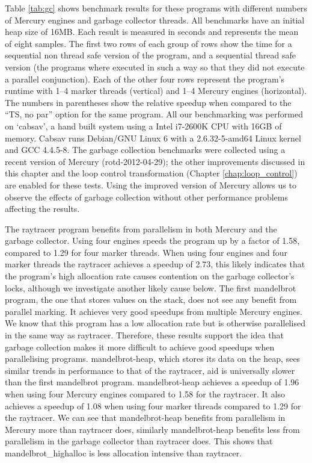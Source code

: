 Table \ref{tab:gc} shows benchmark results for these programs
with different numbers of Mercury engines and garbage collector threads.
All benchmarks have an initial heap size of 16MB.
Each result is measured in seconds and represents the mean of eight samples.
The first two rows of each group of rows show the time for a sequential
non thread safe version of the program,
and a sequential thread safe version
(the programs where executed in such a way so that they did not execute a
parallel conjunction).
Each of the other four rows represent the program's runtime with
1--4 marker threads (vertical) and
1--4 Mercury engines (horizontal).
The numbers in parentheses show the relative speedup when compared to the
``TS, no par'' option for the same program.
\label{cabsav}
All our benchmarking was performed on `cabsav',
a hand built system using a Intel i7-2600K CPU 
with 16GB of memory.
Cabsav runs Debian/GNU Linux 6
with a 2.6.32-5-amd64 Linux kernel and GCC 4.4.5-8.
The garbage collection benchmarks were collected using a recent version of
Mercury (rotd-2012-04-29);
the other improvements discussed in this chapter and the loop control
transformation (Chapter \ref{chap:loop_control})
are enabled for these tests.
Using the improved version of Mercury allows us to observe the effects of
garbage collection without other performance problems affecting the results.

The raytracer program benefits from parallelism in both Mercury and the
garbage collector.
Using four engines speeds the program up by a factor of 1.58,
compared to 1.29 for four marker threads.
When using four engines and four marker threads the raytracer
achieves a speedup of 2.73,
this likely indicates that the program's high allocation rate causes
contention on the garbage collector's locks,
although we investigate another likely cause below.
The first mandelbrot program, the one that stores values on the stack,
does not see any benefit from parallel marking.
It achieves very good speedups from multiple Mercury engines.
We know that this program has a low allocation rate
but is otherwise parallelised in the same way as raytracer.
Therefore,
these results support the idea that garbage collection makes it more
difficult to achieve good speedups when parallelising programs.
mandelbrot-heap, which stores its data on the heap,
sees similar trends in performance to that of the raytracer,
aid is universally slower than the first mandelbrot program.
mandelbrot-heap achieves a speedup of 1.96 when using four Mercury engines
compared to 1.58 for the raytracer.
It also achieves a speedup of 1.08 when using four marker threads compared
to 1.29 for the raytracer.
We can see that mandelbrot-heap benefits from parallelism in Mercury
more than raytracer does,
similarly mandelbrot-heap benefits less from parallelism in the garbage
collector than raytracer does.
This shows that mandelbrot\_highalloc is less allocation intensive
than raytracer.

